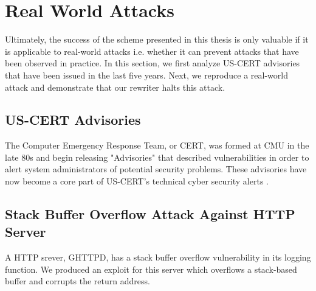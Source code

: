 \section{Real World Attacks}

Ultimately, the success of the scheme presented in this thesis is only valuable if it is applicable
to real-world attacks i.e. whether it can prevent attacks that have been observed in practice. In
this section, we first analyze US-CERT advisories that have been issued in the last five years.
Next, we reproduce a real-world attack and demonstrate that our rewriter halts this attack.

\subsection{US-CERT Advisories}

The Computer Emergency Response Team, or CERT, was formed at CMU in the late 80s and begin releasing
"Advisories" that described vulnerabilities in order to alert system administrators of potential
security problems. These advisories have now become a core part of US-CERT's technical cyber
security alerts \cite{}.

\subsection{Stack Buffer Overflow Attack Against HTTP Server}

A HTTP srever, GHTTPD, has a stack buffer overflow vulnerability in its logging function. We
produced an exploit for this server which overflows a stack-based buffer and corrupts the return
address.
